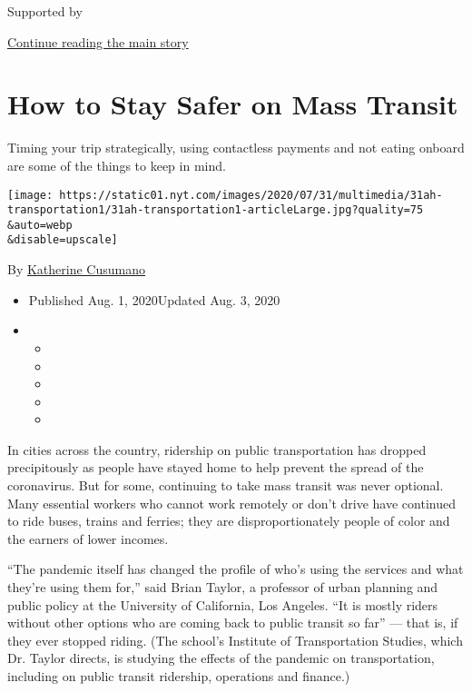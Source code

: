 Supported by

\protect\hyperlink{after-sponsor}{Continue reading the main story}

\hypertarget{how-to-stay-safer-on-mass-transit}{%
\section{How to Stay Safer on Mass
Transit}\label{how-to-stay-safer-on-mass-transit}}

Timing your trip strategically, using contactless payments and not
eating onboard are some of the things to keep in mind.

\texttt{[image: https://static01.nyt.com/images/2020/07/31/multimedia/31ah-transportation1/31ah-transportation1-articleLarge.jpg?quality=75\\\&auto=webp\\\&disable=upscale]}

By \href{https://www.nytimes.com/by/katherine-cusumano}{Katherine
Cusumano}

\begin{itemize}
\item
  Published Aug. 1, 2020Updated Aug. 3, 2020
\item
  \begin{itemize}
  \item
  \item
  \item
  \item
  \item
  \end{itemize}
\end{itemize}

In cities across the country, ridership on public transportation has
dropped precipitously as people have stayed home to help prevent the
spread of the coronavirus. But for some, continuing to take mass transit
was never optional. Many essential workers who cannot work remotely or
don't drive have continued to ride buses, trains and ferries; they are
disproportionately people of color and the earners of lower incomes.

``The pandemic itself has changed the profile of who's using the
services and what they're using them for,'' said Brian Taylor, a
professor of urban planning and public policy at the University of
California, Los Angeles. ``It is mostly riders without other options who
are coming back to public transit so far'' --- that is, if they ever
stopped riding. (The school's Institute of Transportation Studies, which
Dr. Taylor directs, is studying the effects of the pandemic on
transportation, including on public transit ridership, operations and
finance.)

